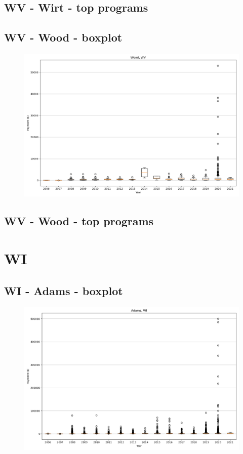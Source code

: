 \subsection*{WV - Wirt - top programs}

\newpage
\subsection*{WV - Wood - boxplot}
\begin{figure}[h]
\centering
\includegraphics[width=7in]{../output/boxplots/counties/Wood-WV_boxplot.png}
\end{figure}


\subsection*{WV - Wood - top programs}

\newpage
\section*{WI}
\subsection*{WI - Adams - boxplot}
\begin{figure}[h]
\centering
\includegraphics[width=7in]{../output/boxplots/counties/Adams-WI_boxplot.png}
\end{figure}


